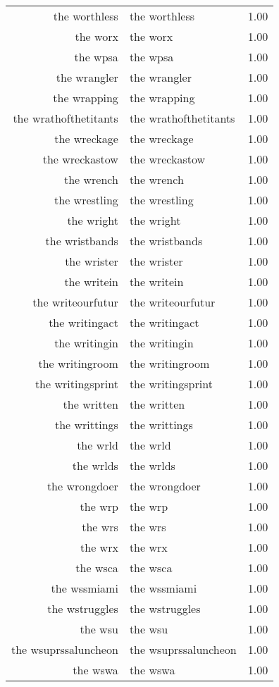 \begin{table}[ht]
\begin{tabular}{rlr}
  the worthless & the worthless & 1.00 \\ 
  the worx & the worx & 1.00 \\ 
  the wpsa & the wpsa & 1.00 \\ 
  the wrangler & the wrangler & 1.00 \\ 
  the wrapping & the wrapping & 1.00 \\ 
  the wrathofthetitants & the wrathofthetitants & 1.00 \\ 
  the wreckage & the wreckage & 1.00 \\ 
  the wreckastow & the wreckastow & 1.00 \\ 
  the wrench & the wrench & 1.00 \\ 
  the wrestling & the wrestling & 1.00 \\ 
  the wright & the wright & 1.00 \\ 
  the wristbands & the wristbands & 1.00 \\ 
  the wrister & the wrister & 1.00 \\ 
  the writein & the writein & 1.00 \\ 
  the writeourfutur & the writeourfutur & 1.00 \\ 
  the writingact & the writingact & 1.00 \\ 
  the writingin & the writingin & 1.00 \\ 
  the writingroom & the writingroom & 1.00 \\ 
  the writingsprint & the writingsprint & 1.00 \\ 
  the written & the written & 1.00 \\ 
  the writtings & the writtings & 1.00 \\ 
  the wrld & the wrld & 1.00 \\ 
  the wrlds & the wrlds & 1.00 \\ 
  the wrongdoer & the wrongdoer & 1.00 \\ 
  the wrp & the wrp & 1.00 \\ 
  the wrs & the wrs & 1.00 \\ 
  the wrx & the wrx & 1.00 \\ 
  the wsca & the wsca & 1.00 \\ 
  the wssmiami & the wssmiami & 1.00 \\ 
  the wstruggles & the wstruggles & 1.00 \\ 
  the wsu & the wsu & 1.00 \\ 
  the wsuprssaluncheon & the wsuprssaluncheon & 1.00 \\ 
  the wswa & the wswa & 1.00 \\ 

\end{tabular}
\end{table}

